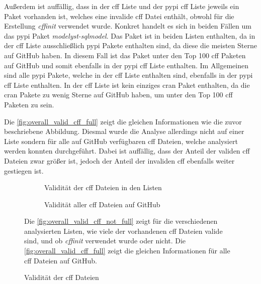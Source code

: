 Außerdem ist auffällig, dass in der \gls{cff} Liste und der \gls{pypi} \gls{cff} Liste jeweils ein Paket vorhanden ist, welches eine invalide \gls{cff} Datei enthält, obwohl für die Erstellung \emph{cffinit} verwendet wurde.
Konkret handelt es sich in beiden Fällen um das \gls{pypi} Paket \emph{modelyst-sqlmodel}.
Das Paket ist in beiden Listen enthalten, da in der \gls{cff} Liste ausschließlich \gls{pypi} Pakete enthalten sind, da diese die meisten Sterne auf GitHub haben.
In diesem Fall ist das Paket unter den Top 100 \gls{cff} Paketen auf GitHub und somit ebenfalls in der \gls{pypi} \gls{cff} Liste enthalten.
Im Allgemeinen sind alle \gls{pypi} Pakete, welche in der \gls{cff} Liste enthalten sind, ebenfalls in der \gls{pypi} \gls{cff} Liste enthalten.
In der \gls{cff} Liste ist kein einziges \gls{cran} Paket enthalten, da die \gls{cran} Pakete zu wenig Sterne auf GitHub haben, um unter den Top 100 \gls{cff} Paketen zu sein.

Die \autoref{fig:overall_valid_cff_full} zeigt die gleichen Informationen wie die zuvor beschriebene Abbildung.
Diesmal wurde die Analyse allerdings nicht auf einer Liste sondern für alle auf GitHub verfügbaren \gls{cff} Dateien, welche analysiert werden konnten durchgeführt.
Dabei ist auffällig, dass der Anteil der validen \gls{cff} Dateien zwar größer ist, jedoch der Anteil der invaliden \gls{cff} ebenfalls weiter gestiegen ist.

\begin{figure}
    \begin{subfigure}{.5\textwidth}
        \centering
        
        \caption{Validität der \gls{cff} Dateien in den Listen}
        \label{fig:overall_valid_cff_not_full}
    \end{subfigure}%
    \begin{subfigure}{.5\textwidth}
        \centering
        
        \caption{Validität aller \gls{cff} Dateien auf GitHub}
        \label{fig:overall_valid_cff_full}
    \end{subfigure}
    \caption{Validität der \gls{cff} Dateien}
    \label{fig:overall_valid_cff}
    \small
    \raggedright
    Die \autoref{fig:overall_valid_cff_not_full} zeigt für die verschiedenen analysierten Listen, wie viele der vorhandenen \gls{cff} Dateien valide sind, und ob \emph{cffinit} verwendet wurde oder nicht. Die \autoref{fig:overall_valid_cff_full} zeigt die gleichen Informationen für alle \gls{cff} Dateien auf GitHub.
\end{figure}

